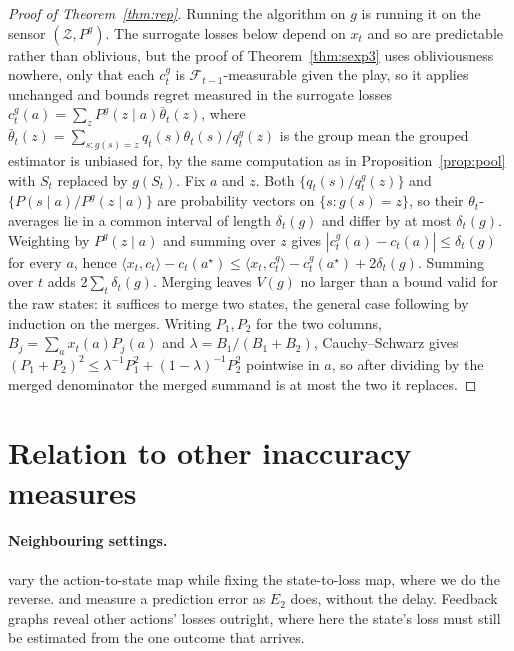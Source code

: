 \documentclass{article}
\theoremstyle{remark}
\newcommand{\etwo}{E_2}
\begin{document}
\begin{proof}[Proof of Theorem~\ref{thm:rep}]
Running the algorithm on $g$ is running it on the sensor $(\mathcal Z,P^g)$. The surrogate
losses below depend on $x_t$ and so are predictable rather than oblivious, but the proof of
Theorem~\ref{thm:sexp3} uses obliviousness nowhere, only that each $c^g_t$ is
$\mathcal F_{t-1}$-measurable given the play, so it applies unchanged and bounds regret measured
in the surrogate losses
$c^g_t(a)=\sum_zP^g(z\mid a)\bar\theta_t(z)$, where
$\bar\theta_t(z)=\sum_{s:g(s)=z}q_t(s)\theta_t(s)/q_t^g(z)$ is the group mean the grouped
estimator is unbiased for, by the same computation as in Proposition~\ref{prop:pool} with
$S_t$ replaced by $g(S_t)$. Fix $a$ and $z$. Both $\{q_t(s)/q_t^g(z)\}$ and
$\{P(s\mid a)/P^g(z\mid a)\}$ are probability vectors on $\{s:g(s)=z\}$, so their
$\theta_t$-averages lie in a common interval of length $\delta_t(g)$ and differ by at most
$\delta_t(g)$. Weighting by $P^g(z\mid a)$ and summing over $z$ gives
$|c^g_t(a)-c_t(a)|\le\delta_t(g)$ for every $a$, hence
$\langle x_t,c_t\rangle-c_t(a^\star)\le\langle x_t,c^g_t\rangle-c^g_t(a^\star)+2\delta_t(g)$.
Summing over $t$ adds $2\sum_t\delta_t(g)$. Merging leaves $V(g)$ no larger than a bound valid for
the raw states: it suffices to merge two states, the general case following by induction on the
merges. Writing $P_1,P_2$ for the two columns, $B_j=\sum_ax_t(a)P_j(a)$ and
$\lambda=B_1/(B_1+B_2)$, Cauchy--Schwarz gives
$(P_1+P_2)^2\le\lambda^{-1}P_1^2+(1-\lambda)^{-1}P_2^2$ pointwise in $a$, so after dividing by the
merged denominator the merged summand is at most the two it replaces.
\end{proof}

\section{Relation to other inaccuracy measures}\label{app:transfer}

\paragraph{Neighbouring settings.} \citet{vernade2020} vary the action-to-state map while fixing
the state-to-loss map, where we do the reverse. \citet{wang2026} and \citet{zhang2026impatient}
measure a prediction error as $\etwo$ does, without the delay. Feedback graphs
\citep{alon2015,esposito2022,gabbianelli2023} reveal other actions' losses outright, where here the
state's loss must still be estimated from the one outcome that arrives.
\end{document}
